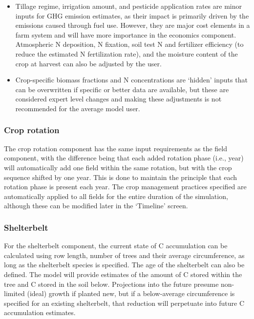\begin{itemize}[leftmargin=1.5em]
    \item Tillage regime, irrigation amount, and pesticide application rates
          are minor inputs for GHG emission estimates, as their impact is
          primarily driven by the emissions caused through fuel use. However,
          they are major cost elements in a farm system and will have more
          importance in the economics component. Atmospheric N deposition,
          N fixation, soil test N and fertilizer efficiency (to reduce the
          estimated N fertilization rate), and the moisture content of the
          crop at harvest can also be adjusted by the user.

    \item Crop-specific biomass fractions and N concentrations are `hidden'
          inputs that can be overwritten if specific or better data are
          available, but these are considered expert level changes and making
          these adjustments is not recommended for the average model user.
\end{itemize}

\subsubsection{Crop rotation}

The crop rotation component has the same input requirements as the field
component, with the difference being that each added rotation phase (i.e.,
year) will automatically add one field within the same rotation, but with the
crop sequence shifted by one year. This is done to maintain the principle that
each rotation phase is present each year. The crop management practices
specified are automatically applied to all fields for the entire duration of the
simulation, although these can be modified later in the `Timeline' screen.

\subsubsection{Shelterbelt}

For the shelterbelt component, the current state of C accumulation can be
calculated using row length, number of trees and their average circumference,
as long as the shelterbelt species is specified. The age of the shelterbelt can
also be defined. The model will provide estimates of the amount of C stored
within the tree and C stored in the soil below. Projections into the future
presume non-limited (ideal) growth if planted new, but if a below-average
circumference is specified for an existing shelterbelt, that reduction will
perpetuate into future C accumulation estimates.

